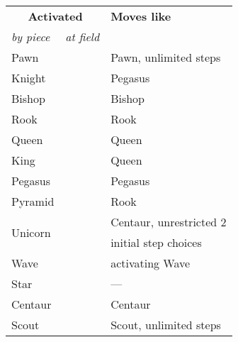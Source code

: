 \begin{table}[!h]
\centering
\begin{tabular}{ lll }
\toprule %
\multicolumn{2}{c}{ \textbf{Activated} }        & \textbf{Moves like}           \\
\cmidrule{1-2} %
\emph{by piece}             &   \emph{at field} &                               \\
\midrule %
Pawn                        &                   & Pawn, unlimited steps         \\
Knight                      &                   & Pegasus                       \\
Bishop                      &                   & Bishop                        \\
Rook                        &                   & Rook                          \\
Queen                       &                   & Queen                         \\
King                        &                   & Queen                         \\
\cmidrule{1-3} %
Pegasus                     &                   & Pegasus                       \\
Pyramid                     &                   & Rook                          \\
\cmidrule{1-3} %
\multirow{2}{*}{Unicorn}    &                   & Centaur, unrestricted 2       \\
                            &                   & initial step choices          \\
\cmidrule{1-3} %
Wave                        &                   & activating Wave               \\
Star                        &                   & ---                           \\
Centaur                     &                   & Centaur                       \\
Scout                       &                   & Scout, unlimited steps        \\

\end{tabular}
\end{table}
